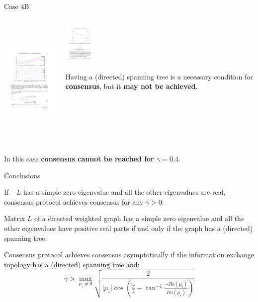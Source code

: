 \begin{frame}{Case 4B}

\begin{columns}
 \begin{column}{.70\textwidth}
	\begin{center}
		\includegraphics[height=6cm]{images/StatesCase4B.pdf}
	\end{center}
	\vskip 0.3cm
 \end{column}
 \begin{column}{.30\textwidth}
 	\vskip 0.3cm
	\begin{center}
		\includegraphics[height=2cm]{images/GraphCase4.pdf}
	\end{center}
	Having a (directed) spanning tree is a necessary condition for  
	{\textcolor{green!40!black}{\fontsize{13}{15}\textbf{consensus}}},
	but  it {\textcolor{green!40!black}{\fontsize{13}{15}\textbf{may not be achieved}}}.
 \end{column}
\end{columns}
In this case  {\textcolor{green!40!black}{\fontsize{13}{15}\textbf{consensus cannot be reached for $\gamma = 0.4$}}}.
\vskip 0.3cm
\end{frame}


\begin{frame}{Conclusions}
\vskip 0.5cm
\begin{block}{}
If  $-L$ has a simple zero eigenvalue and all the other eigenvalues are real, 
consensus protocol achieves consensus for any $\gamma > 0$:
\end{block}
\vskip 0.1cm
\begin{block}{}
Matrix $L$ of a directed weighted graph has a simple zero eigenvalue and
all the other eigenvalues have positive real parts if and only if the graph has a (directed) spanning tree.
\end{block}
\vskip 0.1cm
\begin{block}{}
Consensus protocol achieves consensus asymptotically 
if the information exchange topology has a (directed) spanning tree and:
$$
\gamma > \max_{\mu_i \neq 0} {\sqrt{ \frac{ 2 }{\lvert \mu_i \rvert \cos{ \left( \frac{\pi}{2} - \tan^{-1}{ \frac{-Re(\mu_i)}{Im(\mu_i)} } \right) }}}}
$$
\end{block}
\end{frame}
